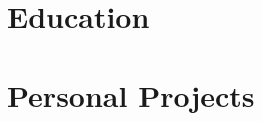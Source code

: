 \documentclass[]{friggeri-cv}
\begin{document}
\section{Education}
\begin{entrylist}
  \resumeEducation
\end{entrylist}

\section{Personal Projects}
\begin{entrylist}
  \resumeProjects
\end{entrylist}
\end{document}
